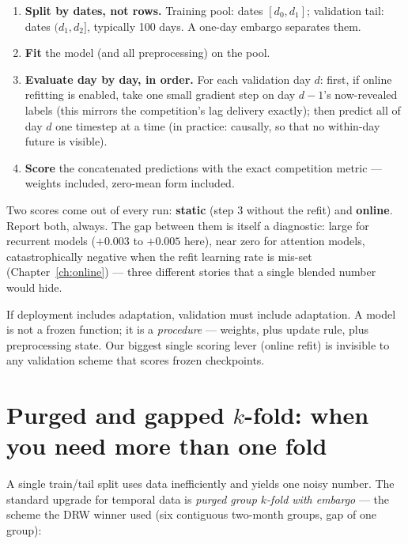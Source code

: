 \begin{enumerate}
\item \textbf{Split by dates, not rows.} Training pool: dates
  $[d_0, d_1]$; validation tail: dates $(d_1, d_2]$, typically 100 days.
  A one-day embargo separates them.
\item \textbf{Fit} the model (and all preprocessing) on the pool.
\item \textbf{Evaluate day by day, in order.} For each validation day $d$:
  first, if online refitting is enabled, take one small gradient step on
  day $d{-}1$'s now-revealed labels (this mirrors the competition's lag
  delivery exactly); then predict all of day $d$ one timestep at a time
  (in practice: causally, so that no within-day future is visible).
\item \textbf{Score} the concatenated predictions with the exact
  competition metric --- weights included, zero-mean form included.
\end{enumerate}

Two scores come out of every run: \textbf{static} (step 3 without the refit)
and \textbf{online}. Report both, always. The gap between them is itself a
diagnostic: large for recurrent models ($+0.003$ to $+0.005$ here), near
zero for attention models, catastrophically negative when the refit learning
rate is mis-set (Chapter~\ref{ch:online}) --- three different stories that a
single blended number would hide.

\begin{keybox}
If deployment includes adaptation, validation must include adaptation. A
model is not a frozen function; it is a \emph{procedure} --- weights, plus
update rule, plus preprocessing state. Our biggest single scoring lever
(online refit) is invisible to any validation scheme that scores frozen
checkpoints.
\end{keybox}

\section{Purged and gapped $k$-fold: when you need more than one fold}

A single train/tail split uses data inefficiently and yields one noisy
number. The standard upgrade for temporal data is \emph{purged group
$k$-fold with embargo} --- the scheme the DRW winner used (six contiguous
two-month groups, gap of one group):

